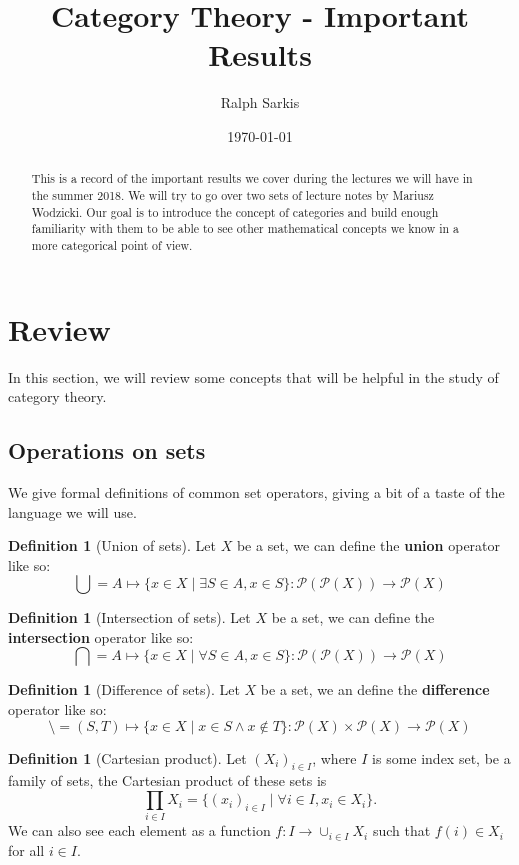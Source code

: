 \documentclass{scrartcl}
\title{Category Theory - Important Results}
\author{Ralph Sarkis} %
\date{\today}  %
\theoremstyle{definition}
\newtheorem{defn}[thm]{Definition}
\theoremstyle{remark}
\newcommand{\mP}{\mathcal{P}}
\begin{document}
\maketitle
\begin{abstract}
This is a record of the important results we cover during the lectures we will have in the summer 2018. We will try to go over two sets of lecture notes by Mariusz Wodzicki. Our goal is to introduce the concept of categories and build enough familiarity with them to be able to see other mathematical concepts we know in a more categorical point of view.
\end{abstract}

\section{Review}
In this section, we will review some concepts that will be helpful in the study of category theory.
\subsection{Operations on sets}
We give formal definitions of common set operators, giving a bit of a taste of the language we will use.
\begin{defn}[Union of sets]
    Let $X$ be a set, we can define the \textbf{union} operator like so:
    \[\bigcup= A \mapsto \{x \in X \mid \exists S \in A, x \in S\}: \mP(\mP(X)) \rightarrow \mP(X) \]
\end{defn}
\begin{defn}[Intersection of sets]
    Let $X$ be a set, we can define the \textbf{intersection} operator like so:
    \[\bigcap= A \mapsto \{x \in X \mid \forall S \in A, x \in S\}: \mP(\mP(X)) \rightarrow \mP(X) \]
\end{defn}
\begin{defn}[Difference of sets]
    Let $X$ be a set, we an define the \textbf{difference} operator like so:
    \[ \setminus= (S,T) \mapsto \{x \in X\mid x \in S \wedge x \notin T\}: \mP(X) \times \mP(X) \rightarrow \mP(X) \]
\end{defn}
\begin{defn}[Cartesian product]
    Let $(X_i)_{i \in I}$, where $I$ is some index set, be a family of sets, the Cartesian product of these sets is 
    \[\prod_{i \in I}X_i = \{ (x_i)_{i \in I} \mid \forall i \in I, x_i \in X_i \}.\]
    We can also see each element as a function $f:I\rightarrow \cup_{i\in I}X_i$ such that $f(i) \in X_i$ for all $i \in I$.
\end{defn}
\end{document}
